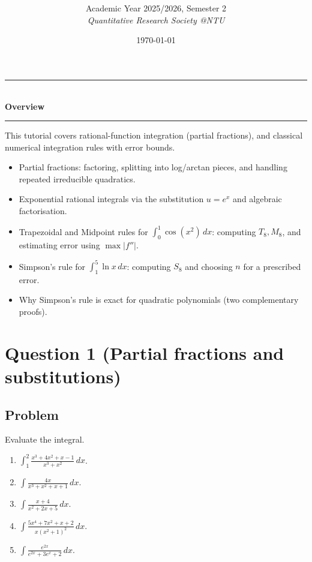 \documentclass[12pt]{article}
\title{
\CourseCode \CourseName \\[0.3em]
\large \DocType
}
\author{
  Academic Year 2025/2026, Semester 2 \\[0.25em]
  \textit{Quantitative Research Society @NTU}
}
\date{\today}
\begin{document}
\maketitle
\thispagestyle{plainfirst}
\pagestyle{main}

\bigskip


\begin{center}
\rule{0.8\textwidth}{0.4pt}\\[4pt]
\textbf{Overview}\\[2pt]
\rule{0.8\textwidth}{0.4pt}
\end{center}

\noindent
This tutorial covers rational-function integration (partial fractions), and classical numerical integration rules with error bounds.

\begin{itemize}[leftmargin=*]
\item Partial fractions: factoring, splitting into log/arctan pieces, and handling repeated irreducible quadratics.
\item Exponential rational integrals via the substitution \(u=e^x\) and algebraic factorisation.
\item Trapezoidal and Midpoint rules for \(\int_0^1 \cos(x^2)\,dx\): computing \(T_8, M_8\), and estimating error using \(\max|f''|\).
\item Simpson's rule for \(\int_1^5 \ln x\,dx\): computing \(S_8\) and choosing \(n\) for a prescribed error.
\item Why Simpson's rule is exact for quadratic polynomials (two complementary proofs).
\end{itemize}

\bigskip

\newpage


\section*{Question 1 (Partial fractions and substitutions)}

\subsection*{Problem}
Evaluate the integral.
\begin{enumerate}[label=(\alph*)]
\item \(\displaystyle \int_{1}^{2}\frac{x^{3}+4x^{2}+x-1}{x^{3}+x^{2}}\,dx\).
\item \(\displaystyle \int \frac{4x}{x^{3}+x^{2}+x+1}\,dx\).
\item \(\displaystyle \int \frac{x+4}{x^{2}+2x+5}\,dx\).
\item \(\displaystyle \int \frac{5x^{4}+7x^{2}+x+2}{x(x^{2}+1)^{2}}\,dx\).
\item \(\displaystyle \int \frac{e^{2x}}{e^{2x}+3e^{x}+2}\,dx\).
\end{enumerate}
\end{document}
